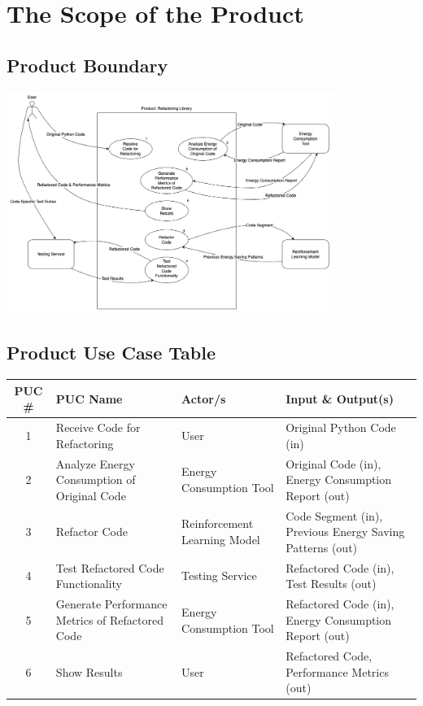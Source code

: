 \documentclass[12pt]{article}
\begin{document}
\section{The Scope of the Product}
\subsection{Product Boundary}
\includegraphics[width=0.8\textwidth]{../Images/UseCaseDiagram.png}
\subsection{Product Use Case Table}

\setlength\extrarowheight{2mm}
\begin{tabularx}{\textwidth}{|c|
  >{\raggedright\arraybackslash}X|p{1.2in}|
  >{\raggedright\arraybackslash}X|}
  \toprule \textbf{PUC \#} & \textbf{PUC Name} & \textbf{Actor/s} & \textbf{Input \& Output(s)} \\
  \midrule
  1 & Receive Code for Refactoring & User & Original Python Code (in) \\ 
  2 & Analyze Energy Consumption of Original Code & Energy Consumption Tool & Original Code (in), Energy Consumption Report (out) \\ 
  3 & Refactor Code & Reinforcement Learning Model & Code Segment (in), Previous Energy Saving Patterns (out) \\ 
  4 & Test Refactored Code Functionality & Testing Service & Refactored Code (in), Test Results (out) \\ 
  5 & Generate Performance Metrics of Refactored Code & Energy Consumption Tool & Refactored Code (in), Energy Consumption Report (out) \\ 
  6 & Show Results & User & Refactored Code, Performance Metrics (out) \\
  \bottomrule
\end{tabularx}
\end{document}
